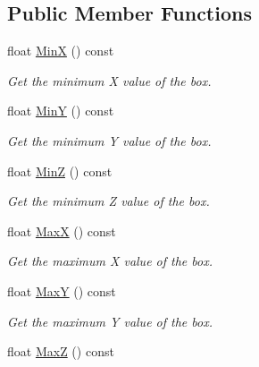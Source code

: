 \subsection*{Public Member Functions}
\begin{DoxyCompactItemize}
\item 
float \hyperlink{classcsBox3_a1684d10b3de0888c02113376bcf491b4}{MinX} () const \hypertarget{classcsBox3_a1684d10b3de0888c02113376bcf491b4}{}\label{classcsBox3_a1684d10b3de0888c02113376bcf491b4}

\begin{DoxyCompactList}\small\item\em Get the minimum X value of the box. \end{DoxyCompactList}\item 
float \hyperlink{classcsBox3_a73cdfa54c11dca6eb943bda4a2b7e79c}{MinY} () const \hypertarget{classcsBox3_a73cdfa54c11dca6eb943bda4a2b7e79c}{}\label{classcsBox3_a73cdfa54c11dca6eb943bda4a2b7e79c}

\begin{DoxyCompactList}\small\item\em Get the minimum Y value of the box. \end{DoxyCompactList}\item 
float \hyperlink{classcsBox3_a0ad994d08b9aeb5be8adf9a2eaefb605}{MinZ} () const \hypertarget{classcsBox3_a0ad994d08b9aeb5be8adf9a2eaefb605}{}\label{classcsBox3_a0ad994d08b9aeb5be8adf9a2eaefb605}

\begin{DoxyCompactList}\small\item\em Get the minimum Z value of the box. \end{DoxyCompactList}\item 
float \hyperlink{classcsBox3_ac19067966974b9291d26295852e3add7}{MaxX} () const \hypertarget{classcsBox3_ac19067966974b9291d26295852e3add7}{}\label{classcsBox3_ac19067966974b9291d26295852e3add7}

\begin{DoxyCompactList}\small\item\em Get the maximum X value of the box. \end{DoxyCompactList}\item 
float \hyperlink{classcsBox3_ac0738f597a36b7c8c17701e6fe48d5a2}{MaxY} () const \hypertarget{classcsBox3_ac0738f597a36b7c8c17701e6fe48d5a2}{}\label{classcsBox3_ac0738f597a36b7c8c17701e6fe48d5a2}

\begin{DoxyCompactList}\small\item\em Get the maximum Y value of the box. \end{DoxyCompactList}\item 
float \hyperlink{classcsBox3_ac391f4928f19f28e077442fe90a02f56}{MaxZ} () const \hypertarget{classcsBox3_ac391f4928f19f28e077442fe90a02f56}{}\label{classcsBox3_ac391f4928f19f28e077442fe90a02f56}


\end{DoxyCompactItemize}
